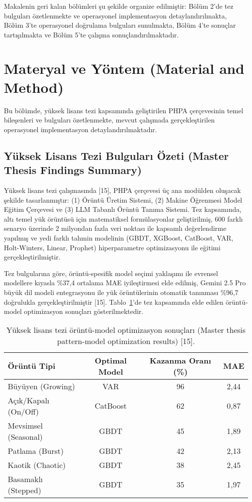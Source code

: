 \documentclass[12pt,a4paper]{article}
\begin{document}
Makalenin geri kalan bölümleri şu şekilde organize edilmiştir: Bölüm 2'de tez bulguları özetlenmekte ve operasyonel implementasyon detaylandırılmakta, Bölüm 3'te operasyonel doğrulama bulguları sunulmakta, Bölüm 4'te sonuçlar tartışılmakta ve Bölüm 5'te çalışma sonuçlandırılmaktadır.

\section{Materyal ve Yöntem (Material and Method)}

Bu bölümde, yüksek lisans tezi kapsamında geliştirilen PHPA çerçevesinin temel bileşenleri ve bulguları özetlenmekte, mevcut çalışmada gerçekleştirilen operasyonel implementasyon detaylandırılmaktadır.

\subsection{Yüksek Lisans Tezi Bulguları Özeti (Master Thesis Findings Summary)}

Yüksek lisans tezi çalışmasında [15], PHPA çerçevesi üç ana modülden oluşacak şekilde tasarlanmıştır: (1) Örüntü Üretim Sistemi, (2) Makine Öğrenmesi Model Eğitim Çerçevesi ve (3) LLM Tabanlı Örüntü Tanıma Sistemi. Tez kapsamında, altı temel yük örüntüsü için matematiksel formülasyonlar geliştirilmiş, 600 farklı senaryo üzerinde 2 milyondan fazla veri noktası ile kapsamlı değerlendirme yapılmış ve yedi farklı tahmin modelinin (GBDT, XGBoost, CatBoost, VAR, Holt-Winters, Linear, Prophet) hiperparametre optimizasyonu ile eğitimi gerçekleştirilmiştir.

Tez bulgularına göre, örüntü-spesifik model seçimi yaklaşımı ile evrensel modellere kıyasla \%37,4 ortalama MAE iyileştirmesi elde edilmiş, Gemini 2.5 Pro büyük dil modeli entegrasyonu ile yük örüntülerinin otomatik tanınması \%96,7 doğrulukla gerçekleştirilmiştir [15]. Tablo~\ref{tab:pattern-model}'de tez kapsamında elde edilen örüntü-model optimizasyon sonuçları gösterilmektedir.

\begin{table}[h]
    \centering
    \caption{Yüksek lisans tezi örüntü-model optimizasyon sonuçları (Master thesis pattern-model optimization results) [15].}
    \label{tab:pattern-model}
    \begin{tabular}{@{}lccc@{}}
        \toprule
        Örüntü Tipi & Optimal Model & Kazanma Oranı (\%) & MAE \\
        \midrule
        Büyüyen (Growing) & VAR & 96 & 2,44 \\
        Açık/Kapalı (On/Off) & CatBoost & 62 & 0,87 \\
        Mevsimsel (Seasonal) & GBDT & 45 & 1,89 \\
        Patlama (Burst) & GBDT & 42 & 2,13 \\
        Kaotik (Chaotic) & GBDT & 38 & 2,45 \\
        Basamaklı (Stepped) & GBDT & 35 & 1,97 \\
        \bottomrule
    \end{tabular}
\end{table}
\end{document}
